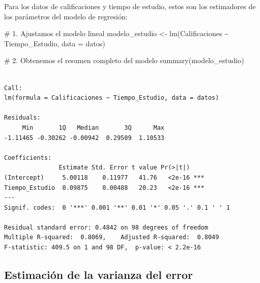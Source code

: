 \documentclass[
  letterpaper,
  DIV=11,
  numbers=noendperiod]{scrreprt}
\newenvironment{Shaded}{\begin{snugshade}}{\end{snugshade}}
\newcommand{\AttributeTok}[1]{\textcolor[rgb]{0.40,0.45,0.13}{#1}}
\newcommand{\CommentTok}[1]{\textcolor[rgb]{0.37,0.37,0.37}{#1}}
\newcommand{\FunctionTok}[1]{\textcolor[rgb]{0.28,0.35,0.67}{#1}}
\newcommand{\NormalTok}[1]{\textcolor[rgb]{0.00,0.23,0.31}{#1}}
\newcommand{\OtherTok}[1]{\textcolor[rgb]{0.00,0.23,0.31}{#1}}
\newcommand{\SpecialCharTok}[1]{\textcolor[rgb]{0.37,0.37,0.37}{#1}}
\begin{document}
\begin{tcolorbox}[enhanced jigsaw, breakable, toprule=.15mm, bottomtitle=1mm, coltitle=black, colbacktitle=quarto-callout-tip-color!10!white, titlerule=0mm, opacitybacktitle=0.6, bottomrule=.15mm, toptitle=1mm, title=\textcolor{quarto-callout-tip-color}{\faLightbulb}\hspace{0.5em}{Ejemplo}, arc=.35mm, rightrule=.15mm, opacityback=0, colframe=quarto-callout-tip-color-frame, leftrule=.75mm, left=2mm, colback=white]

Para los datos de calificaciones y tiempo de estudio, estos son los
estimadores de los parámetros del modelo de regresión:

\begin{Shaded}
\begin{Highlighting}[]
\CommentTok{\# 1. Ajustamos el modelo lineal}
\NormalTok{modelo\_estudio }\OtherTok{\textless{}{-}} \FunctionTok{lm}\NormalTok{(Calificaciones }\SpecialCharTok{\textasciitilde{}}\NormalTok{ Tiempo\_Estudio, }\AttributeTok{data =}\NormalTok{ datos)}

\CommentTok{\# 2. Obtenemos el resumen completo del modelo}
\FunctionTok{summary}\NormalTok{(modelo\_estudio)}
\end{Highlighting}
\end{Shaded}

\begin{verbatim}

Call:
lm(formula = Calificaciones ~ Tiempo_Estudio, data = datos)

Residuals:
     Min       1Q   Median       3Q      Max 
-1.11465 -0.30262 -0.00942  0.29509  1.10533 

Coefficients:
               Estimate Std. Error t value Pr(>|t|)    
(Intercept)     5.00118    0.11977   41.76   <2e-16 ***
Tiempo_Estudio  0.09875    0.00488   20.23   <2e-16 ***
---
Signif. codes:  0 '***' 0.001 '**' 0.01 '*' 0.05 '.' 0.1 ' ' 1

Residual standard error: 0.4842 on 98 degrees of freedom
Multiple R-squared:  0.8069,    Adjusted R-squared:  0.8049 
F-statistic: 409.5 on 1 and 98 DF,  p-value: < 2.2e-16
\end{verbatim}

\end{tcolorbox}

\subsection{Estimación de la varianza del
error}\label{estimaciuxf3n-de-la-varianza-del-error}
\end{document}
